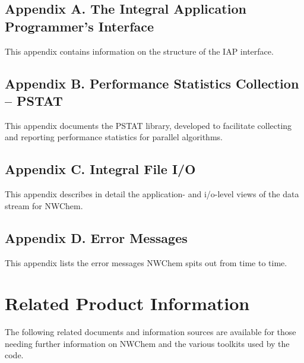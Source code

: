 \subsection*{Appendix A.  The Integral Application Programmer's Interface}

This appendix contains information on the structure of the IAP interface.

\subsection*{Appendix B.  Performance Statistics Collection -- PSTAT}

This appendix documents the PSTAT library, developed to facilitate collecting 
and reporting performance statistics for parallel algorithms.


\subsection*{Appendix C.  Integral File I/O}

This appendix describes in detail the application- and i/o-level views of the 
data stream for NWChem.

\subsection*{Appendix D.  Error Messages}

This appendix lists the error messages NWChem spits out from time to time.

\section*{Related Product Information}

The following related documents and information sources are available for 
those needing further information 
on NWChem and the various toolkits used by the code.

